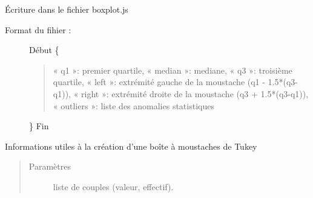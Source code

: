 \documentclass[letterpaper,10pt,openany,oneside,french]{sphinxmanual}
\begin{document}

\begin{fulllineitems}
\label{\detokenize{addQuantitativesDiscretes:add.addQuantitativesDiscretes.infoBoiteTukey}}
Écriture dans le fichier boxplot.js
\begin{description}
\item[{Format du fihier :}] \leavevmode
Début
\{
\begin{quote}

« q1 »: premier quartile,
« median »: mediane,
« q3 »: troisième quartile,
« left »: extrémité gauche de la moustache (q1 - 1.5*(q3-q1)),
« right »: extrémité droite de la moustache (q3 + 1.5*(q3-q1)),
« outliers »: liste des anomalies statistiques
\end{quote}

\}
Fin

\end{description}

Informations utiles à la création d’une boîte à moustaches de Tukey
\begin{quote}\begin{description}
\item[{Paramètres}] \leavevmode
{} \textendash{} liste de couples (valeur, effectif).

\end{description}\end{quote}

\end{fulllineitems}

\end{document}
